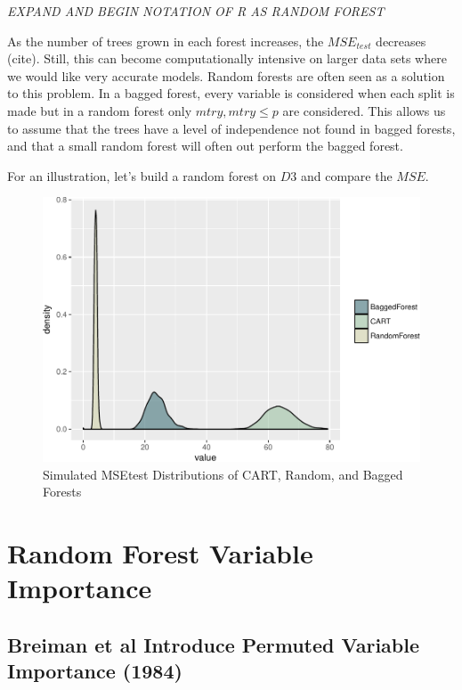 \documentclass[12pt,twoside]{reedthesis}
\begin{document}
  \emph{EXPAND AND BEGIN NOTATION OF R AS RANDOM FOREST}
  
  As the number of trees grown in each forest increases, the
  \(MSE_{test}\) decreases (cite). Still, this can become computationally
  intensive on larger data sets where we would like very accurate models.
  Random forests are often seen as a solution to this problem. In a bagged
  forest, every variable is considered when each split is made but in a
  random forest only \(mtry, mtry \leq p\) are considered. This allows us
  to assume that the trees have a level of independence not found in
  bagged forests, and that a small random forest will often out perform
  the bagged forest.
  
  For an illustration, let's build a random forest on \(D3\) and compare
  the \(MSE\).
  
  \begin{figure}[htbp]
  \centering
  \includegraphics{Thesis_files/figure-latex/baggedvcartvforest-1.pdf}
  \caption{\label{fig:baggedvcartvforest}Simulated MSEtest Distributions of
  CART, Random, and Bagged Forests}
  \end{figure}
  
  \chapter{Random Forest Variable
  Importance}\label{random-forest-variable-importance}
  
  \section{Breiman et al Introduce Permuted Variable Importance
  (1984)}\label{breiman-et-al-introduce-permuted-variable-importance-1984}
  
\end{document}
